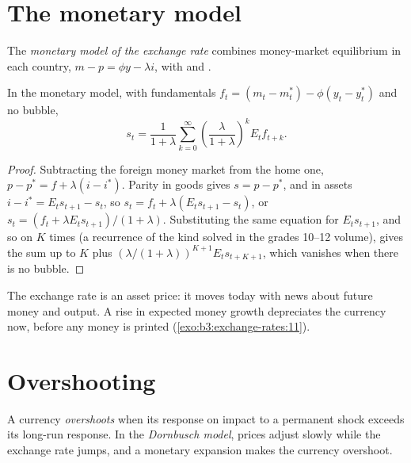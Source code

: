 \section{The monetary model}\label{sec:b3:exchange-rates:monetary}

\begin{definition}\label{def:b3:exchange-rates:monetary-model}
The \emph{monetary model of the exchange rate} combines money-market equilibrium in
each country, $m - p = \phi y - \lambda i$, with  and .
\end{definition}

\begin{proposition}\label{prop:b3:exchange-rates:monetary}
In the monetary model, with fundamentals $f_t = (m_t - m_t^*) - \phi(y_t - y_t^*)$ and no bubble,
\[
s_t = \frac{1}{1 + \lambda}\sum_{k=0}^{\infty}\left(\frac{\lambda}{1 + \lambda}\right)^{k}E_tf_{t+k}.
\]
\end{proposition}

\begin{proof}
Subtracting the foreign money market from the home one, $p - p^* = f + \lambda(i - i^*)$.
Parity in goods gives $s = p - p^*$, and in assets $i - i^* = E_ts_{t+1} - s_t$, so $s_t = f_t +
\lambda(E_ts_{t+1} - s_t)$, or $s_t = (f_t + \lambda E_ts_{t+1})/(1 + \lambda)$. Substituting the same equation
for $E_ts_{t+1}$, and so on $K$ times (a recurrence of the kind solved in the grades
10--12 volume), gives the sum up to $K$ plus $(\lambda/(1 + \lambda))^{K+1}E_ts_{t+K+1}$, which
vanishes when there is no bubble.
\end{proof}

The exchange rate is an asset price: it moves today with news about future
money and output. A rise in expected money growth depreciates the currency now,
before any money is printed (\cref{exo:b3:exchange-rates:11}).

\section{Overshooting}\label{sec:b3:exchange-rates:overshooting}

\begin{definition}[Overshooting]\label{def:b3:exchange-rates:overshooting}
A currency \emph{overshoots} when its response on impact to a permanent shock
exceeds its long-run response. In the \emph{Dornbusch model}, prices adjust slowly
while the exchange rate jumps, and a monetary expansion makes the currency
overshoot.
\end{definition}

